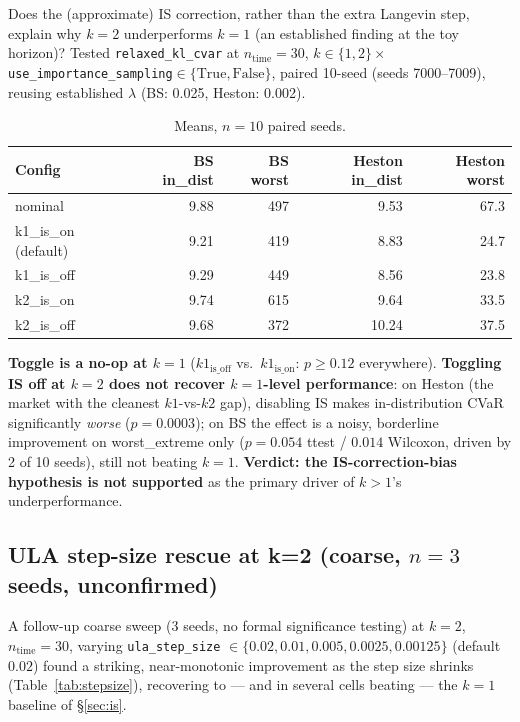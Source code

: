 \documentclass[11pt]{article}
\begin{document}
Does the (approximate) IS correction, rather than the extra Langevin step, explain why
$k=2$ underperforms $k=1$ (an established finding at the toy horizon)? Tested
\texttt{relaxed\_kl\_cvar} at $n_{\mathrm{time}}=30$, $k\in\{1,2\}\times$
\texttt{use\_importance\_sampling}$\in\{\mathrm{True,False}\}$, paired 10-seed (seeds
7000--7009), reusing established $\lambda$ (BS: 0.025, Heston: 0.002).

\begin{table}[h]
  \centering
  \caption{Means, $n=10$ paired seeds.}
  \label{tab:is}
  \begin{tabular}{lrrrr}
    \toprule
    Config & BS in\_dist & BS worst & Heston in\_dist & Heston worst \\
    \midrule
    nominal & 9.88 & 497 & 9.53 & 67.3 \\
    k1\_is\_on (default) & 9.21 & 419 & 8.83 & 24.7 \\
    k1\_is\_off & 9.29 & 449 & 8.56 & 23.8 \\
    k2\_is\_on & 9.74 & 615 & 9.64 & 33.5 \\
    k2\_is\_off & 9.68 & 372 & 10.24 & 37.5 \\
    \bottomrule
  \end{tabular}
\end{table}

\textbf{Toggle is a no-op at $k=1$} ($k1_{\mathrm{is\_off}}$ vs.\ $k1_{\mathrm{is\_on}}$: $p\ge0.12$
everywhere). \textbf{Toggling IS off at $k=2$ does not recover $k=1$-level performance}: on Heston
(the market with the cleanest $k1$-vs-$k2$ gap), disabling IS makes in-distribution CVaR
significantly \emph{worse} ($p=0.0003$); on BS the effect is a noisy, borderline improvement on
worst\_extreme only ($p=0.054$ ttest / $0.014$ Wilcoxon, driven by 2 of 10 seeds), still not
beating $k=1$. \textbf{Verdict: the IS-correction-bias hypothesis is not supported} as the primary
driver of $k>1$'s underperformance.

\subsection{ULA step-size rescue at k=2 (coarse, $n=3$ seeds, unconfirmed)}
\label{sec:stepsize}

A follow-up coarse sweep (3 seeds, no formal significance testing) at $k=2$, $n_{\mathrm{time}}=30$,
varying \texttt{ula\_step\_size} $\in\{0.02, 0.01, 0.005, 0.0025, 0.00125\}$ (default $0.02$) found
a striking, near-monotonic improvement as the step size shrinks (Table~\ref{tab:stepsize}),
recovering to --- and in several cells beating --- the $k=1$ baseline of \S\ref{sec:is}.
\end{document}
